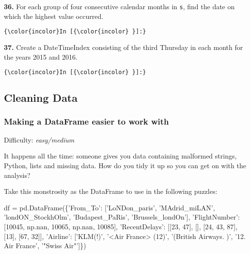 \documentclass[11pt]{article}
\newenvironment{Shaded}{}{}
\newcommand{\DecValTok}[1]{\textcolor[rgb]{0.25,0.63,0.44}{{#1}}}
\newcommand{\StringTok}[1]{\textcolor[rgb]{0.25,0.44,0.63}{{#1}}}
\newcommand{\NormalTok}[1]{{#1}}
\newcommand{\OperatorTok}[1]{\textcolor[rgb]{0.40,0.40,0.40}{{#1}}}
\begin{document}
    \textbf{36.} For each group of four consecutive calendar months in
\texttt{s}, find the date on which the highest value occurred.

    \begin{Verbatim}[commandchars=\\\{\}]
{\color{incolor}In [{\color{incolor} }]:} 
\end{Verbatim}


    \textbf{37.} Create a DateTimeIndex consisting of the third Thursday in
each month for the years 2015 and 2016.

    \begin{Verbatim}[commandchars=\\\{\}]
{\color{incolor}In [{\color{incolor} }]:} 
\end{Verbatim}


    \subsection{Cleaning Data}\label{cleaning-data}

\subsubsection{Making a DataFrame easier to work
with}\label{making-a-dataframe-easier-to-work-with}

Difficulty: \emph{easy/medium}

It happens all the time: someone gives you data containing malformed
strings, Python, lists and missing data. How do you tidy it up so you
can get on with the analysis?

Take this monstrosity as the DataFrame to use in the following puzzles:

\begin{Shaded}
\begin{Highlighting}[]
\NormalTok{df }\OperatorTok{=}\NormalTok{ pd.DataFrame(\{}\StringTok{'From_To'}\NormalTok{: [}\StringTok{'LoNDon_paris'}\NormalTok{, }\StringTok{'MAdrid_miLAN'}\NormalTok{, }\StringTok{'londON_StockhOlm'}\NormalTok{, }
                               \StringTok{'Budapest_PaRis'}\NormalTok{, }\StringTok{'Brussels_londOn'}\NormalTok{],}
              \StringTok{'FlightNumber'}\NormalTok{: [}\DecValTok{10045}\NormalTok{, np.nan, }\DecValTok{10065}\NormalTok{, np.nan, }\DecValTok{10085}\NormalTok{],}
              \StringTok{'RecentDelays'}\NormalTok{: [[}\DecValTok{23}\NormalTok{, }\DecValTok{47}\NormalTok{], [], [}\DecValTok{24}\NormalTok{, }\DecValTok{43}\NormalTok{, }\DecValTok{87}\NormalTok{], [}\DecValTok{13}\NormalTok{], [}\DecValTok{67}\NormalTok{, }\DecValTok{32}\NormalTok{]],}
                   \StringTok{'Airline'}\NormalTok{: [}\StringTok{'KLM(!)'}\NormalTok{, }\StringTok{'<Air France> (12)'}\NormalTok{, }\StringTok{'(British Airways. )'}\NormalTok{, }
                               \StringTok{'12. Air France'}\NormalTok{, }\StringTok{'"Swiss Air"'}\NormalTok{]\})}
\end{Highlighting}
\end{Shaded}
\end{document}
